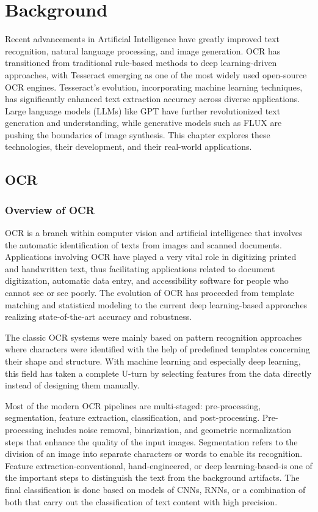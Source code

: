 \chapter{Background}

Recent advancements in Artificial Intelligence have greatly improved text recognition, natural language processing, and image generation. OCR has transitioned from traditional rule-based methods to deep learning-driven approaches, with Tesseract emerging as one of the most widely used open-source OCR engines. Tesseract’s evolution, incorporating machine learning techniques, has significantly enhanced text extraction accuracy across diverse applications. Large language models (LLMs) like GPT have further revolutionized text generation and understanding, while generative models such as FLUX are pushing the boundaries of image synthesis. This chapter explores these technologies, their development, and their real-world applications.


\section{OCR}
\subsection{Overview of OCR}
OCR is a branch within computer vision and artificial intelligence that involves the automatic identification of texts from images and scanned documents. Applications involving OCR have played a very vital role in digitizing printed and handwritten text, thus facilitating applications related to document digitization, automatic data entry, and accessibility software for people who cannot see or see poorly. The evolution of OCR has proceeded from template matching and statistical modeling to the current deep learning-based approaches realizing state-of-the-art accuracy and robustness.

The classic OCR systems were mainly based on pattern recognition approaches where characters were identified with the help of predefined templates concerning their shape and structure. With machine learning and especially deep learning, this field has taken a complete U-turn by selecting features from the data directly instead of designing them manually.

Most of the modern OCR pipelines are multi-staged: pre-processing, segmentation, feature extraction, classification, and post-processing. Pre-processing includes noise removal, binarization, and geometric normalization steps that enhance the quality of the input images. Segmentation refers to the division of an image into separate characters or words to enable its recognition. Feature extraction-conventional, hand-engineered, or deep learning-based-is one of the important steps to distinguish the text from the background artifacts. The final classification is done based on models of CNNs, RNNs, or a combination of both that carry out the classification of text content with high precision.

